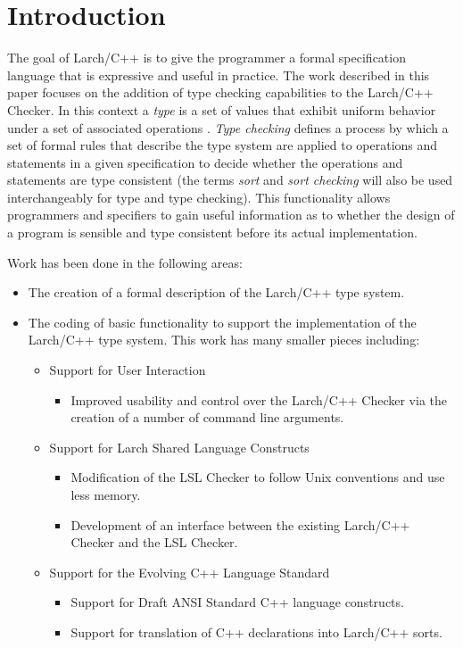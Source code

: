 \section{Introduction}
\label{introduction}
The goal of Larch/C++ \cite{Leavens96c} is to give the programmer a
formal specification language that is expressive and useful in
practice. The work described in this paper focuses on the addition of
type checking capabilities to the Larch/C++ Checker. In
this context a
\emph{type} is a set of values that exhibit uniform behavior under
a set of associated operations \cite{Watt90}. \emph{Type checking}
defines a process by which a set of formal rules that describe the
type system are applied to operations and statements in a given
specification to decide whether the operations and statements are type
consistent (the terms \emph{sort} and \emph{sort checking} will also
be used interchangeably for type and type checking). This functionality allows programmers and specifiers to gain useful
information as to whether the design of a program is sensible and type
consistent before its actual implementation.  

Work has been done in the following areas:

\begin{itemize}
\item The creation of a formal description of the Larch/C++ type system.

\item The coding of basic functionality to support the 
implementation of the Larch/C++ type system. This work has many
smaller pieces including:

\begin{itemize}
\item Support for User Interaction 
\begin{itemize}
\item Improved usability and control over the Larch/C++ Checker via the
creation of a number of command line arguments.
\end{itemize}

\item Support for Larch Shared Language Constructs
\begin{itemize}
\item Modification of the LSL Checker to follow Unix conventions and
use less memory.
\item Development of an interface between the existing Larch/C++ Checker and
the LSL Checker.
\end{itemize}

\item Support for the Evolving C++ Language Standard
\begin{itemize}
\item Support for Draft ANSI Standard C++ \cite{C++Apr95}
language constructs.
\item Support for translation of C++ declarations into Larch/C++
sorts.
\end{itemize}
\end{itemize}
\end{itemize}


